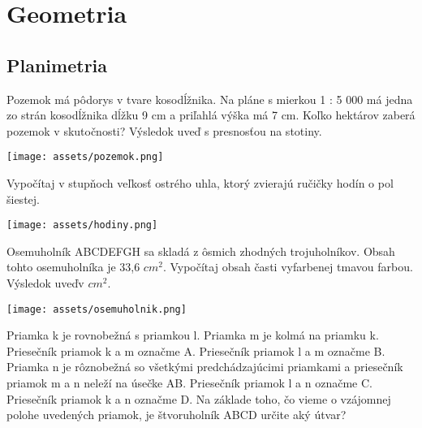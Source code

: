 \chapter{Geometria}

\section{Planimetria}

\begin{example}
	Pozemok má pôdorys v tvare kosodĺžnika. Na pláne s mierkou 1 : 5 000 má jedna zo strán
	kosodĺžnika dĺžku 9 cm a priľahlá výška má 7 cm. Koľko hektárov zaberá pozemok
	v skutočnosti? Výsledok uveď s presnosťou na stotiny.
	
	\begin{center}
		\texttt{[image: assets/pozemok.png]}
	\end{center}
\end{example}

\begin{example}
	Vypočítaj v stupňoch veľkosť ostrého uhla, ktorý zvierajú ručičky hodín o pol šiestej.
	
	\begin{center}
		\texttt{[image: assets/hodiny.png]}
	\end{center}
\end{example}

\begin{example}
	Osemuholník ABCDEFGH sa skladá z ôsmich zhodných trojuholníkov. Obsah tohto
	osemuholníka je 33,6 $cm^2$. Vypočítaj obsah časti vyfarbenej tmavou farbou. Výsledok uveďv $cm^2$.
	
	\begin{center}
		\texttt{[image: assets/osemuholnik.png]}
	\end{center}
\end{example}

\begin{example}
	Priamka k je rovnobežná s priamkou l. Priamka m je kolmá na priamku k. 
	Priesečník priamok k a m označme A. Priesečník priamok l a m označme B.
	Priamka n je rôznobežná so všetkými predchádzajúcimi priamkami a priesečník priamok m a n neleží na úsečke AB. Priesečník priamok l a n označme C. Priesečník priamok k a n označme D. Na základe toho, čo vieme o vzájomnej polohe uvedených priamok, je štvoruholník ABCD
	určite aký útvar?
\end{example}

